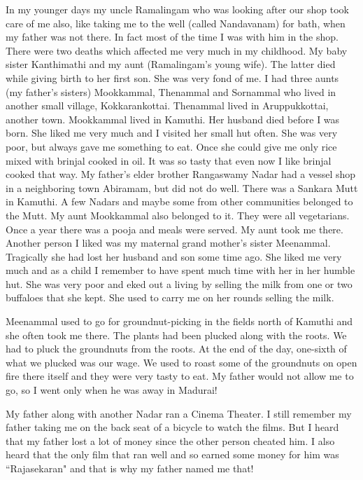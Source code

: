 In my younger days my uncle Ramalingam who was looking after our shop 
took care of me also, like taking me to the well (called Nandavanam) for 
bath, when my father was not there. In fact most of the time I was with 
him in the shop.
\vskip 1pt
There were two deaths which affected me very much in my childhood. My 
baby sister Kanthimathi and my aunt (Ramali\-ngam's young wife). The 
latter died while giving birth to her first son. She was very fond of 
me.
\vskip 1pt
I had three aunts (my father's sisters) Mookkammal, Thena\-mmal and 
Sornammal who lived in another small village, Kokka\-rankottai. Thenammal 
lived in Aruppukkottai, another town. Mookkammal lived in Kamuthi. Her 
husband died before I was born. She liked me very much and I visited her 
small hut often. She was very poor, but always gave me something to eat. 
Once she could give me only rice mixed with brinjal cooked in oil. It 
was so tasty that even now I like brinjal cooked that way. My father's 
elder brother Rangaswamy Nadar had a vessel shop in a neighboring town 
Abiramam, but did not do well.
\vskip 1pt
There was a Sankara Mutt in Kamuthi. A few Nadars and maybe some from 
other communities belonged to the Mutt. My aunt Mookkammal also belonged 
to it. They were all vegetarians. Once a year there was a pooja and 
meals were served. My aunt took me there.
\vskip 1pt
Another person I liked was my maternal grand mother's sister Meenammal. 
Tragically she had lost her husband and son some time ago. She liked me 
very much and as a child I remem\-ber to have spent much time with her in 
her humble hut. She was very poor and eked out a living by selling the 
milk from one or two buffaloes that she kept. She used to carry me on 
her rounds selling the milk.

Meenammal used to go for groundnut-picking in the fields north of 
Kamuthi and she often took me there. The plants had been plucked along 
with the roots. We had to pluck the groundnuts from the roots. At the 
end of the day, one-sixth of what we plucked was our wage. We used to 
roast some of the groundnuts on open fire there itself and they were 
very tasty to eat. My father would not allow me to go, so I went only 
when he was away in Madurai!

My father along with another Nadar ran a Cinema Theater. I still 
remember my father taking me on the back seat of a bicy\-cle to watch the 
films. But I heard that my father lost a lot of money since the other 
person cheated him. I also heard that the only film that ran well and so 
earned some money for him was ``Rajasekaran" and that is why my father 
named me that!

